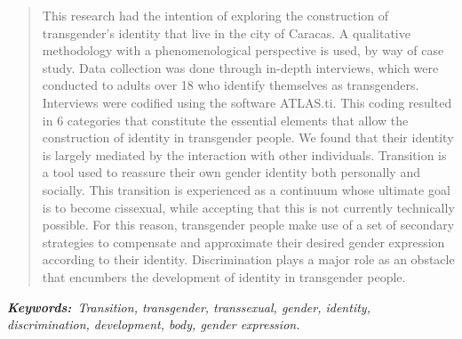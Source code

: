\begin{quote}
This research had the intention of exploring the construction of
transgender's identity that live in the city of Caracas. A qualitative
methodology with a phenomenological perspective is used, by way of case
study. Data collection was done through in-depth interviews, which were
conducted to adults over 18 who identify themselves as
transgenders. Interviews were codified using the software ATLAS.ti\@. This
coding resulted in 6 categories that constitute the essential elements that
allow the construction of identity in transgender people. We found that their
identity is largely mediated by the interaction with other individuals.
Transition is a tool used to reassure their own gender identity both
personally and socially. This transition is experienced as a continuum whose
ultimate goal is to become cissexual, while accepting that this is not
currently technically possible. For this reason, transgender people make use
of a set of secondary strategies to compensate and approximate their desired
gender expression according to their identity. Discrimination plays a major
role as an obstacle that encumbers the development of identity in transgender
people.
\end{quote}

\itshape\textbf{Keywords:}\normalfont{}\ Transition, transgender, transsexual,
gender, identity, discrimination, development, body, gender expression.
